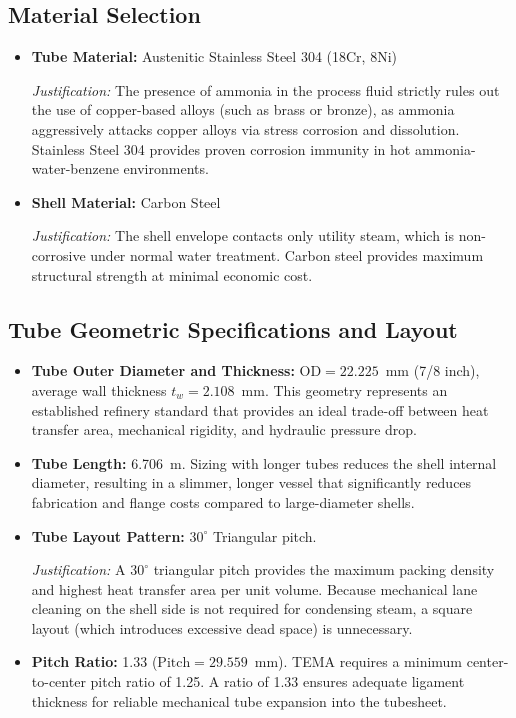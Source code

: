 \documentclass[12pt]{article}
\begin{document}
\subsection{Material Selection}

\begin{itemize}
\item \textbf{Tube Material:} Austenitic Stainless Steel 304 (18Cr, 8Ni)

\textit{Justification:} The presence of ammonia in the process fluid strictly rules out the use of copper-based alloys (such as brass or bronze), as ammonia aggressively attacks copper alloys via stress corrosion and dissolution. Stainless Steel 304 provides proven corrosion immunity in hot ammonia-water-benzene environments.

\item \textbf{Shell Material:} Carbon Steel

\textit{Justification:} The shell envelope contacts only utility steam, which is non-corrosive under normal water treatment. Carbon steel provides maximum structural strength at minimal economic cost.
\end{itemize}

\subsection{Tube Geometric Specifications and Layout}

\begin{itemize}
\item \textbf{Tube Outer Diameter and Thickness:} $\text{OD} = 22.225$~mm (7/8 inch), average wall thickness $t_w = 2.108$~mm. This geometry represents an established refinery standard that provides an ideal trade-off between heat transfer area, mechanical rigidity, and hydraulic pressure drop.
\item \textbf{Tube Length:} 6.706~m. Sizing with longer tubes reduces the shell internal diameter, resulting in a slimmer, longer vessel that significantly reduces fabrication and flange costs compared to large-diameter shells.
\item \textbf{Tube Layout Pattern:} $30^\circ$ Triangular pitch.

\textit{Justification:} A $30^\circ$ triangular pitch provides the maximum packing density and highest heat transfer area per unit volume. Because mechanical lane cleaning on the shell side is not required for condensing steam, a square layout (which introduces excessive dead space) is unnecessary.
\item \textbf{Pitch Ratio:} 1.33 ($\text{Pitch} = 29.559$~mm). TEMA requires a minimum center-to-center pitch ratio of 1.25. A ratio of 1.33 ensures adequate ligament thickness for reliable mechanical tube expansion into the tubesheet.
\end{itemize}
\end{document}
